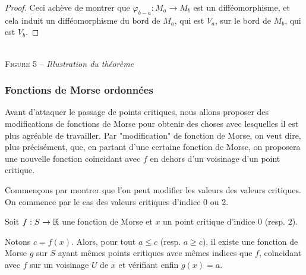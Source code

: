 \begin{proof}
    Ceci achève de montrer que $\varphi_{b-a}:M_a\to M_b$ est un difféomorphisme, et cela 
    induit un difféomorphisme du bord de $M_a$, qui est $V_a$, sur le bord de $M_b$, qui est $V_b$.
\end{proof}

\begin{center}
    \\
    \textsc{Figure 5} – \textit{Illustration du théorème}
\end{center}

\subsubsection{Fonctions de Morse ordonnées}

Avant d'attaquer le passage de points critiques, nous allons proposer des modifications de 
fonctions de Morse pour obtenir des choses avec lesquelles il est plus agréable de travailler. 
Par "modification" de fonction de Morse, on veut dire, plus précisément, que, en partant 
d'une certaine fonction de Morse, on proposera une nouvelle fonction coïncidant avec $f$ 
en dehors d'un voisinage d'un point critique.

Commençons par montrer que l'on peut modifier les valeurs des valeurs critiques. 
On commence par le cas des valeurs critiques d'indice $0$ ou $2$. 

\begin{lem}
    Soit $f:S\to\operatorname{\mathbb R}$ une fonction de Morse et $x$ un point critique d'indice $0$ (resp. $2$).

    Notons $c=f(x)$. Alors, pour tout $a\leq c$ (resp. $a\geq c$), il existe une fonction de 
    Morse $g$ sur $S$ ayant mêmes points critiques avec mêmes indices que $f$,
    coïncidant avec $f$ sur un voisinage $U$ de $x$ et vérifiant enfin $g(x)=a$. 
\end{lem}

